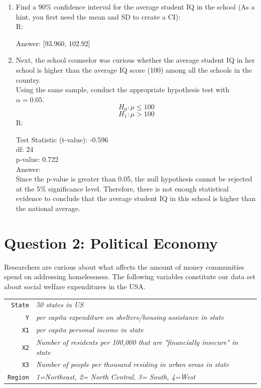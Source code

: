 \documentclass[12pt,letterpaper]{article}
\begin{document}
\begin{enumerate}
	\item Find a 90\% confidence interval for the average student IQ in the school (As a hint, you first need the mean and SD to create a CI):\\
	R:
	 
	Answer: [93.960, 102.92]
	\item Next, the school counselor was curious  whether  the average student IQ in her school is higher than the average IQ score (100) among all the schools in the country.\\ 
	\noindent Using the same sample, conduct the appropriate hypothesis test with $\alpha=0.05$.
	\[
	H_0: \mu \le 100
	\]
	\[
	H_1: \mu > 100
	\]
	R:
	
	Test Statistic (t-value): -0.596\\
	df: 24\\
	p-value: 0.722\\
	
	Answer: \\
	Since the p-value is greater than 0.05, the null hypothesis cannot be rejected at the 5\% significance level. Therefore, there is not enough statistical evidence to conclude that the average student IQ in this school is higher than the national average.
\end{enumerate}

\newpage

	\section*{Question 2: Political Economy}

\noindent Researchers are curious about what affects the amount of money communities spend on addressing homelessness. The following variables constitute our data set about social welfare expenditures in the USA. \\
\vspace{.5cm}


\begin{tabular}{r|l}
	\texttt{State} &\emph{50 states in US} \\
	\texttt{Y} & \emph{per capita expenditure on shelters/housing assistance in state}\\
	\texttt{X1} &\emph{per capita personal income in state} \\
	\texttt{X2} &  \emph{Number of residents per 100,000 that are "financially insecure" in state}\\
	\texttt{X3} &  \emph{Number of people per thousand residing in urban areas in state} \\
	\texttt{Region} &  \emph{1=Northeast, 2= North Central, 3= South, 4=West} \\
\end{tabular}
\end{document}
